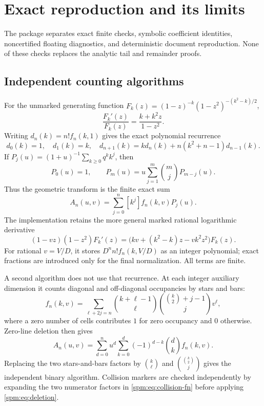 \section{Exact reproduction and its limits}\label{spm:sec:computation}
The package separates exact finite checks, symbolic coefficient identities, noncertified floating diagnostics, and deterministic document reproduction. None of these checks replaces the analytic tail and remainder proofs.

\subsection{Independent counting algorithms}
For the unmarked generating function $F_k(z)=(1-z)^{-k}(1-z^2)^{-(k^2-k)/2}$,
\[
 \frac{F_k'(z)}{F_k(z)}=\frac{k+k^2z}{1-z^2}.
\]
Writing $d_n(k)=n!f_n(k,1)$ gives the exact polynomial recurrence
\begin{equation}\label{spm:eq:exactrecurrence}
 d_0(k)=1,\quad d_1(k)=k,\quad
 d_{n+1}(k)=k d_n(k)+n(k^2+n-1)d_{n-1}(k).
\end{equation}
If $P_j(u)=(1+u)^{-1}\sum_{k\geq0}q^kk^j$, then
\[
 P_0(u)=1,\qquad
 P_m(u)=u\sum_{j=1}^m\binom mj P_{m-j}(u).
\]
Thus the geometric transform is the finite exact sum
\begin{equation}\label{spm:eq:finite-transform}
 A_n(u,v)=\sum_{j=0}^n[k^j]f_n(k,v)P_j(u).
\end{equation}
The implementation retains the more general marked rational logarithmic derivative
\[
 (1-vz)(1-z^2)F_k'(z)
 =\bigl(kv+(k^2-k)z-vk^2z^2\bigr)F_k(z).
\]
For rational $v=V/D$, it stores $D^nn!f_n(k,V/D)$ as an integer polynomial; exact fractions are introduced only for the final normalization. All terms are finite.

A second algorithm does not use that recurrence. At each integer auxiliary dimension it counts diagonal and off-diagonal occupancies by stars and bars:
\begin{equation}\label{spm:eq:starsbars}
 f_n(k,v)=\sum_{\ell+2j=n}
 \binom{k+\ell-1}{\ell}
 \binom{\binom k2+j-1}{j}v^\ell,
\end{equation}
where a zero number of cells contributes $1$ for zero occupancy and $0$ otherwise. Zero-line deletion then gives
\begin{equation}\label{spm:eq:deletion}
 A_n(u,v)=\sum_{d=0}^n u^d\sum_{k=0}^d
                   (-1)^{d-k}\binom dk f_n(k,v).
\end{equation}
Replacing the two stars-and-bars factors by $\binom{k}{\ell}$ and $\binom{\binom k2}{j}$ gives the independent binary algorithm. Collision markers are checked independently by expanding the two numerator factors in \eqref{spm:eq:collision-fn} before applying \eqref{spm:eq:deletion}.

